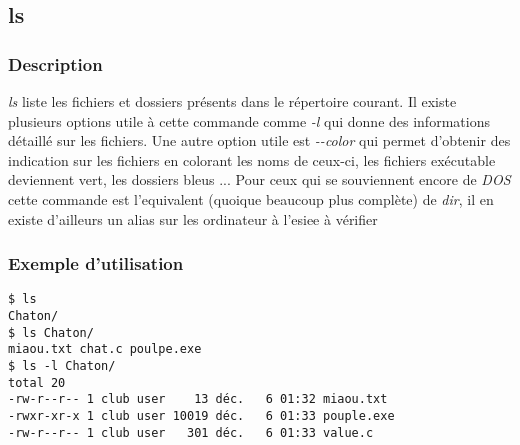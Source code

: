 \subsection*{ls}
\subsubsection*{Description}
\emph{ls} liste les fichiers et dossiers présents dans le répertoire courant.
Il existe plusieurs options utile à cette commande comme \emph{-l} qui donne des informations détaillé sur les fichiers.
Une autre option utile est \emph{-{}-color} qui permet d'obtenir des indication sur les fichiers en colorant les noms de ceux-ci, les fichiers exécutable deviennent vert, les dossiers bleus ...
Pour ceux qui se souviennent encore de \emph{DOS} cette commande est l'equivalent (quoique beaucoup plus complète) de \emph{dir}, il en existe d'ailleurs un alias sur les ordinateur à l'esiee \textcolor{grey2}{à vérifier}

\subsubsection*{Exemple d'utilisation}
\begin{lstlisting}
$ ls
Chaton/
$ ls Chaton/
miaou.txt chat.c poulpe.exe
$ ls -l Chaton/
total 20
-rw-r--r-- 1 club user    13 déc.   6 01:32 miaou.txt
-rwxr-xr-x 1 club user 10019 déc.   6 01:33 pouple.exe
-rw-r--r-- 1 club user   301 déc.   6 01:33 value.c
\end{lstlisting}
